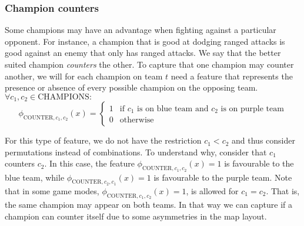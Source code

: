 \subsubsection{Champion counters}
Some champions may have an advantage when fighting against a particular opponent.
For instance, a champion that is good at dodging ranged attacks is good against an enemy that only has ranged attacks.
We say that the better suited champion \emph{counters} the other.
To capture that one champion may counter another, we will for each champion on team $t$ need a feature that represents the presence or absence of every possible champion on the opposing team. $\forall c_1, c_2 \in \text{CHAMPIONS}:$
\begin{equation}\label{eq:counter}
\phi_{\text{COUNTER},c_1,c_2}(x) = 
\begin{cases} 
1 & \text{if } c_1 \text{ is on blue team and } c_2 \text{ is on purple team} \\ 
0 & \text{otherwise} 
\end{cases}
\end{equation}

For this type of feature, we do not have the restriction $c_1 < c_2$ and thus consider permutations instead of combinations.
To understand why, consider that $c_1$ counters $c_2$.
In this case, the feature $\phi_{\text{COUNTER},c_1,c_2}(x) = 1$ is favourable to the blue team, while $\phi_{\text{COUNTER},c_2,c_1}(x) = 1$ is favourable to the purple team.
Note that in some game modes, $\phi_{\text{COUNTER},c_1,c_2}(x) = 1$, is allowed for $c_1 = c_2$. That is, the same champion may appear on both teams.
In that way we can capture if a champion can counter itself due to some asymmetries in the map layout.

